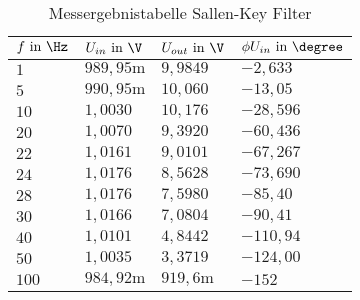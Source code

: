 \begin{table}[]
\centering
\caption{Messergebnistabelle Sallen-Key Filter}
\label{tab:sallen_key_erg_table}
\begin{tabular}{|l|l|l|l|}
\hline
\rowcolor[HTML]{C0C0C0} 
$f\text{ in }\Hz   $&$ U_{in}\text{ in }\V       $&$ U_{out}\text{ in }\V     $&$ \phi U_{in}\text{ in }\degree   $\\ \hline
$1   $&$ 989,95\text{m} $&$ 9,9849   $&$ -2,633  $\\ \hline
$5   $&$ 990,95\text{m} $&$ 10,060   $&$ -13,05  $\\ \hline
$10  $&$ 1,0030    $&$ 10,176   $&$ -28,596 $\\ \hline
$20  $&$ 1,0070    $&$ 9,3920   $&$ -60,436 $\\ \hline
$22  $&$ 1,0161    $&$ 9,0101   $&$ -67,267 $\\ \hline
$24  $&$ 1,0176    $&$ 8,5628   $&$ -73,690 $\\ \hline
$28  $&$ 1,0176    $&$ 7,5980   $&$ -85,40  $\\ \hline
$30  $&$ 1,0166    $&$ 7,0804   $&$ -90,41  $\\ \hline
$40  $&$ 1,0101    $&$ 4,8442   $&$ -110,94 $\\ \hline
$50  $&$ 1,0035    $&$ 3,3719   $&$ -124,00 $\\ \hline
$100 $&$ 984,92\text{m} $&$ 919,6\text{m} $&$ -152    $\\ \hline
\end{tabular}
\end{table}